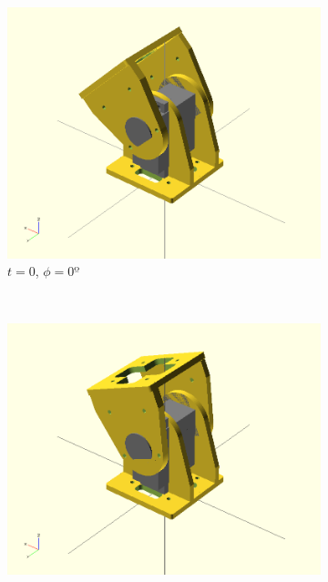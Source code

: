 \begin{figure}[h]
		\centering
        \begin{subfigure}[b]{0.18\textwidth}
                \centering
                \includegraphics[width=\textwidth]{images/Gait_osc_offset_45.png}
                \caption{$t = 0$, $\phi=0º$}
                \label{fig:Gait_osc_offset_45}
        \end{subfigure}
        ~
        \begin{subfigure}[b]{0.18\textwidth}
                \centering
                \includegraphics[width=\textwidth]{images/Gait_osc_offset_67_5.png}

\end{subfigure}
\end{figure}
